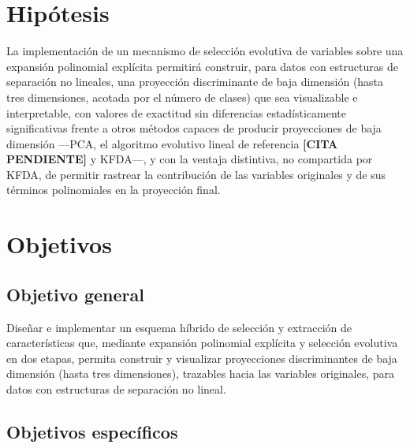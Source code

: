 	\section{Hipótesis}
	\label{sec:Hipótesis}
	
	La implementación de un mecanismo de selección evolutiva de variables sobre una expansión polinomial explícita permitirá construir, para datos con estructuras de separación no lineales, una proyección discriminante de baja dimensión (hasta tres dimensiones, acotada por el número de clases) que sea visualizable e interpretable, con valores de exactitud sin diferencias estadísticamente significativas frente a otros métodos capaces de producir proyecciones de baja dimensión —PCA, el algoritmo evolutivo lineal de referencia \textbf{[CITA PENDIENTE]} y KFDA—, y con la ventaja distintiva, no compartida por KFDA, de permitir rastrear la contribución de las variables originales y de sus términos polinomiales en la proyección final.
	
	\section{Objetivos}
	\label{sec:Objetivo-General}
	
	\subsection{Objetivo general}
	
	Diseñar e implementar un esquema híbrido de selección y extracción de características que, mediante expansión polinomial explícita y selección evolutiva en dos etapas, permita construir y visualizar proyecciones discriminantes de baja dimensión (hasta tres dimensiones), trazables hacia las variables originales, para datos con estructuras de separación no lineal.
	
	\subsection{Objetivos específicos}
	
